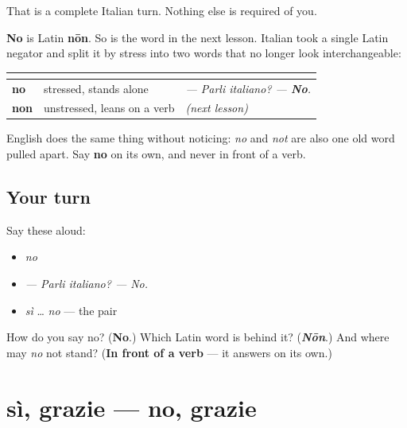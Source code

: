 That is a complete Italian turn. Nothing else is required of you.

\begin{cousinweb}
\textbf{No} is Latin \textbf{nōn}. So is the word in the next lesson. Italian took a single Latin negator and split it by stress into two words that no longer look interchangeable:

\noindent
\begin{tabularx}{\linewidth}{@{}>{\raggedright\arraybackslash}X>{\raggedright\arraybackslash}X>{\raggedright\arraybackslash}X@{}}
\toprule
\textbf{} & \textbf{} & \textbf{} \\
\midrule
\textbf{no} & stressed, stands alone & \emph{— Parli italiano? — \textbf{No}.} \\
\textbf{non} & unstressed, leans on a verb & \emph{(next lesson)} \\
\bottomrule
\end{tabularx}

English does the same thing without noticing: \emph{no} and \emph{not} are also one old word pulled apart. Say \textbf{no} on its own, and never in front of a verb.
\end{cousinweb}

\subsection*{Your turn}
Say these aloud:

\begin{itemize}
\raggedright
  \item \emph{no}
  \item \emph{— Parli italiano? — No.}
  \item \emph{sì} … \emph{no} — the pair
\end{itemize}

\begin{tcolorbox}[breakable,colback=teal!4,colframe=teal!35!black,title={Before you move on}]
How do you say no? (\textbf{No}.) Which Latin word is behind it? (\emph{\textbf{Nōn}}.) And where may \emph{no} not stand? (\textbf{In front of a verb} — it answers on its own.)
\end{tcolorbox}
\section[sì, grazie / no, grazie]{sì, grazie — no, grazie}

\label{lesson:IT-C29-si-no-grazie}



